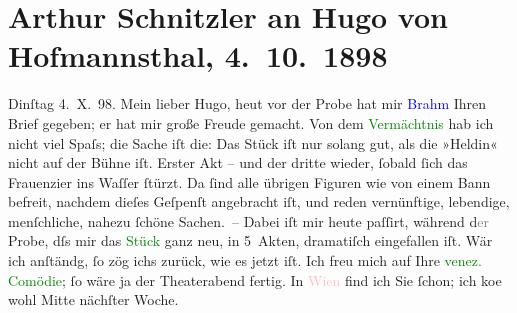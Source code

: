 

               \section[Arthur Schnitzler an Hugo von Hofmannsthal, 4. 10. 1898]{ Arthur Schnitzler an Hugo von Hofmannsthal, 4. 10. 1898}\nopagebreak{}\rehead{ }\normalsize\beginnumbering{} \toendnotes[C]{\smallbreak\pagebreak[2]} 
\toendnotes[C]{\smallbreak}\pstart
           {\pb}Dinſtag 4. X. 98.\pend
           \pstart
           Mein lieber Hugo, heut vor der Probe hat mir \textcolor{blue}{Brahm}{}\ledrightnote{\textcolor{blue}{Otto Brahm}} Ihren Brief gegeben; er hat mir große Freude
                    gemacht. Von dem \textcolor{green}{Vermächtnis}{}\ledrightnote{\textcolor{green}{Das Vermächtnis. Schauspiel in drei Akten}} hab ich nicht
                    viel Spaſs; die Sache iſt die: Das Stück iſt nur solang gut, als die »Heldin«
                    nicht auf der Bühne iſt. Erster Akt – und der dritte wieder, ſobald ſich das
                        Frauenzi{\geminationm}er ins {\pb}Waſſer ſtürzt. Da ſind alle übrigen Figuren wie von einem Bann befreit,
                    nachdem dieſes Geſpenſt angebracht iſt, und reden vernünftige, lebendige,
                    menſchliche, nahezu ſchöne Sachen. – Dabei iſt mir heute paſſirt, während d\textcolor{gray}{er}
                    Probe, dſs mir das \textcolor{green}{Stück}{}
                    ganz neu, in 5 {\pb}Akten, dramatiſch eingefallen iſt.
                    Wär ich anſtändg, ſo zög ichs zurück, wie es jetzt iſt.\pend
           \pstart
           Ich freu mich auf Ihre \textcolor{green}{venez.
                        Comödie}{}; ſo wäre ja der Theaterabend fertig. In \textcolor{pink}{Wien}{}\ledrightnote{\textcolor{pink}{Wien}} find ich Sie ſchon; ich ko{\geminationm}e wohl Mitte nächſter Woche.\pend
